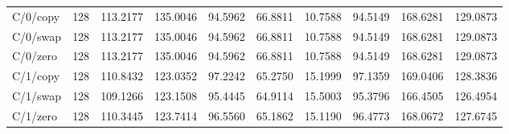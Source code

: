 \begin{longtable}{lrrrrrrrrr}
C/0/copy & 128 & 113.2177 & 135.0046 & 94.5962 & 66.8811 & 10.7588 & 94.5149 & 168.6281 & 129.0873 \\
C/0/swap & 128 & 113.2177 & 135.0046 & 94.5962 & 66.8811 & 10.7588 & 94.5149 & 168.6281 & 129.0873 \\
C/0/zero & 128 & 113.2177 & 135.0046 & 94.5962 & 66.8811 & 10.7588 & 94.5149 & 168.6281 & 129.0873 \\
C/1/copy & 128 & 110.8432 & 123.0352 & 97.2242 & 65.2750 & 15.1999 & 97.1359 & 169.0406 & 128.3836 \\
C/1/swap & 128 & 109.1266 & 123.1508 & 95.4445 & 64.9114 & 15.5003 & 95.3796 & 166.4505 & 126.4954 \\
C/1/zero & 128 & 110.3445 & 123.7414 & 96.5560 & 65.1862 & 15.1190 & 96.4773 & 168.0672 & 127.6745 \\
\bottomrule
\end{longtable}
